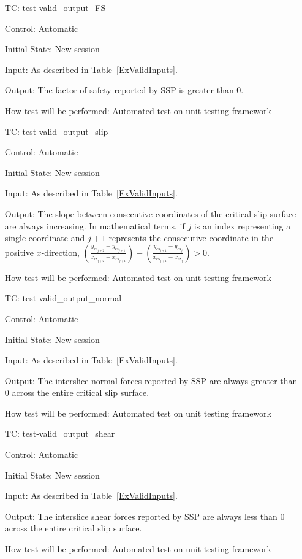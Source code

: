\documentclass[12pt, titlepage]{article}
\newcounter{testnum} %
\newcommand{\progname}{SSP}
\begin{document}
\begin{enumerate}[label=TC\arabic*:,ref={\arabic*}]
	
\item [TC\refstepcounter{testnum}\thetestnum: \label{TC_ValidOutFS}] 
test-valid\_output\_FS

Control: Automatic

Initial State: New session

Input: As described in Table~\ref{ExValidInputs}.

Output: The factor of safety reported by \progname{} is greater than 0.

How test will be performed: Automated test on unit testing framework

\item [TC\refstepcounter{testnum}\thetestnum: \label{TC_ValidOutSlip}] 
test-valid\_output\_slip

Control: Automatic

Initial State: New session

Input: As described in Table~\ref{ExValidInputs}.

Output: The slope between consecutive coordinates of the critical slip surface 
are always increasing. In mathematical terms, if $j$ is an index representing a 
single coordinate and $j+1$ represents the consecutive coordinate in the 
positive $x$-direction, \newline
$\left(\frac{y_{\text{cs}_{j+2}}-y_{\text{cs}_{j+1}}}{x_{\text{cs}_{j+2}}-
		x_{\text{cs}_{j+1}}}\right)-\left(\frac{y_{\text{cs}_{j+1}}-
			y_{\text{cs}_{j}}}{x_{\text{cs}_{j+1}}-
				x_{\text{cs}_{j}}}\right) > 0$.

How test will be performed: Automated test on unit testing framework

\item [TC\refstepcounter{testnum}\thetestnum: \label{TC_ValidOutNormal}] 
test-valid\_output\_normal

Control: Automatic

Initial State: New session

Input: As described in Table~\ref{ExValidInputs}.

Output: The interslice normal forces reported by \progname{} are always greater 
than 0 across the entire critical slip surface.

How test will be performed: Automated test on unit testing framework

\item [TC\refstepcounter{testnum}\thetestnum: \label{TC_ValidOutShear}] 
test-valid\_output\_shear

Control: Automatic

Initial State: New session

Input: As described in Table~\ref{ExValidInputs}.

Output: The interslice shear forces reported by \progname{} are always less 
than 0 across the entire critical slip surface.

How test will be performed: Automated test on unit testing framework
	
\end{enumerate}
\end{document}
